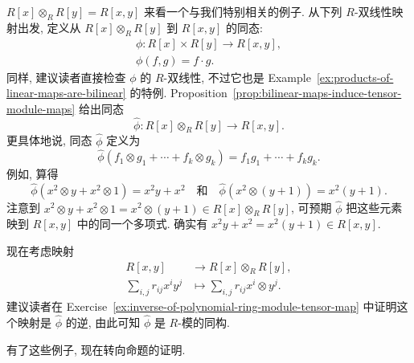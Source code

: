 \begin{Example}{{\textmd{$R[x]\otimes_{R}R[y]=R[x,y]$}}}\leavevmode\label{ex:polynomial-ring-module-tensor-isomorphism}
来看一个与我们特别相关的例子. 从下列 $R$-双线性映射出发, 定义从 $R[x]\otimes_{R}R[y]$ 到 $R[x,y]$ 的同态:
\[
  \begin{gathered}
    \phi:R[x]\times R[y]\to R[x,y],\\
    \phi(f,g)=f\cdot g.
  \end{gathered}
\]
同样, 建议读者直接检查 $\phi$ 的 $R$-双线性, 不过它也是 Example~\ref{ex:products-of-linear-maps-are-bilinear} 的特例. Proposition~\ref{prop:bilinear-maps-induce-tensor-module-maps} 给出同态
\[
  \widehat{\phi}:R[x]\otimes_{R}R[y]\to R[x,y].
\]
更具体地说, 同态 $\widehat{\phi}$ 定义为
\[
  \widehat{\phi}(f_{1}\otimes g_{1}+\cdots+f_{k}\otimes g_{k})
    =f_{1}g_{1}+\cdots+f_{k}g_{k}.
\]
例如, 算得
\[
  \widehat{\phi}(x^{2}\otimes y+x^{2}\otimes1)=x^{2}y+x^{2}
  \quad\text{和}\quad
  \widehat{\phi}(x^{2}\otimes(y+1))=x^{2}(y+1).
\]
注意到 $x^{2}\otimes y+x^{2}\otimes1=x^{2}\otimes(y+1)\in R[x]\otimes_{R}R[y]$, 可预期 $\widehat{\phi}$ 把这些元素映到 $R[x,y]$ 中的同一个多项式. 确实有 $x^{2}y+x^{2}=x^{2}(y+1)\in R[x,y]$.

现在考虑映射
\[
  \begin{aligned}
    R[x,y]&\to R[x]\otimes_{R}R[y],\\
    \sum_{i,j}r_{ij}x^{i}y^{j}&\mapsto\sum_{i,j}r_{ij}x^{i}\otimes y^{j}.
  \end{aligned}
\]
建议读者在 Exercise~\ref{ex:inverse-of-polynomial-ring-module-tensor-map} 中证明这个映射是 $\widehat{\phi}$ 的逆, 由此可知 $\widehat{\phi}$ 是 $R$-模的同构.
\end{Example}

有了这些例子, 现在转向命题的证明.

